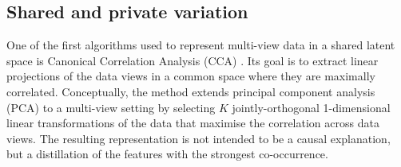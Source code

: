 \documentclass[../thesis.tex]{subfiles}
\begin{document}


\subsection{Shared and private variation}


One of the first algorithms used to represent multi-view data in a shared latent space is Canonical Correlation Analysis (CCA) \cite{hotelling1992relations, hardoon2004canonical}. Its goal is to extract linear projections of the data views in a common space where they are maximally correlated. Conceptually, the method extends principal component analysis (PCA) to a multi-view setting by selecting $K$ jointly-orthogonal 1-dimensional linear transformations of the data that maximise the correlation across data views. The resulting representation is not intended to be a causal explanation, but a distillation of the features with the strongest co-occurrence.
\end{document}
